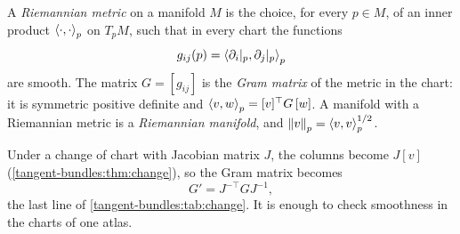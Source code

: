 \begin{notechapter}
\begin{definition}\label{riemannian-optimization:def:metric}
A \emph{Riemannian metric} on a manifold $M$ is the choice, for every
$p\in M$, of an inner product $\left\langle \cdot, \cdot \right\rangle_p$ on $T_pM$, such that
in every chart the functions
\[
  g_{ij}(p) = \left\langle \partial_i|_p, \partial_j|_p \right\rangle_p
\]
are smooth. The matrix $G = [g_{ij}]$ is the \emph{Gram matrix} of the
metric in the chart: it is symmetric positive definite and
$\left\langle v, w \right\rangle_p = [v]^\top G\,[w]$. A manifold with a Riemannian metric is a
\emph{Riemannian manifold}, and $\left\|v\right\|_p = \left\langle v, v \right\rangle_p^{1/2}$.
\end{definition}

Under a change of chart with Jacobian matrix $J$, the columns become
$J[v]$ (\cref{tangent-bundles:thm:change}), so the Gram matrix becomes
\[
  G' = J^{-\top}GJ^{-1} ,
\]
the last line of \cref{tangent-bundles:tab:change}. It is enough to check
smoothness in the charts of one atlas.


\end{notechapter}
